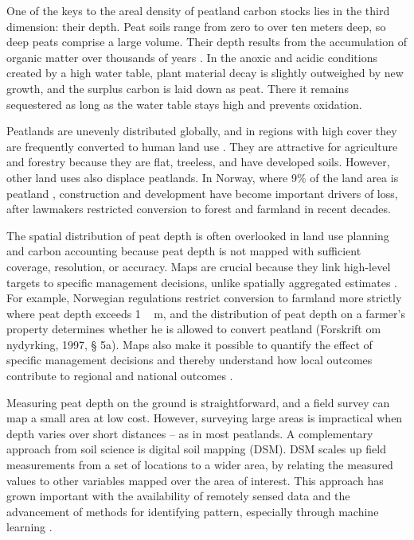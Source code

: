 \documentclass[soil, manuscript]{copernicus}
\begin{document}
One of the keys to the areal density of peatland carbon stocks lies in the third dimension: their depth.
Peat soils range from zero to over ten meters deep, so deep peats comprise a large volume.
Their depth results from the accumulation of organic matter over thousands of years \citep{loiselDatabaseSynthesisNorthern2014, joostenRolePeatlandsClimate2016}.
In the anoxic and acidic conditions created by a high water table, plant material decay is slightly outweighed by new growth, and the surplus carbon is laid down as peat.
There it remains sequestered as long as the water table stays high and prevents oxidation.

Peatlands are unevenly distributed globally, and in regions with high cover they are frequently converted to human land use \citep{unepGlobalPeatlandsAssessment2022}.
They are attractive for agriculture and forestry because they are flat, treeless, and have developed soils.
However, other land uses also displace peatlands.
In Norway, where 9\% of the land area is peatland \citep{brynLandCoverNorway2018}, construction and development have become important drivers of loss, after lawmakers restricted conversion to forest and farmland in recent decades.

The spatial distribution of peat depth is often overlooked in land use planning and carbon accounting because peat depth is not mapped with sufficient coverage, resolution, or accuracy.
Maps are crucial because they link high-level targets to specific management decisions, unlike spatially aggregated estimates \citep{oecdOECDEnvironmentalPerformance2022}.
For example, Norwegian regulations restrict conversion to farmland more strictly where peat depth exceeds \unit{1\,m}, and the distribution of peat depth on a farmer's property determines whether he is allowed to convert peatland (Forskrift om nydyrking, 1997, § 5a).
Maps also make it possible to quantify the effect of specific management decisions and thereby understand how local outcomes contribute to regional and national outcomes \citep{oecdOECDEnvironmentalPerformance2022}.

Measuring peat depth on the ground is straightforward, and a field survey can map a small area at low cost.
However, surveying large areas is impractical when depth varies over short distances -- as in most peatlands.
A complementary approach from soil science is digital soil mapping (DSM).
DSM scales up field measurements from a set of locations to a wider area, by relating the measured values to other variables mapped over the area of interest.
This approach has grown important with the availability of remotely sensed data and the advancement of methods for identifying pattern, especially through machine learning \citep{minasnyDigitalMappingPeatlands2019, wadouxMachineLearningDigital2020}.
\end{document}
